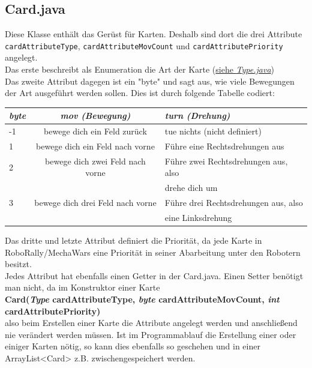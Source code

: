 \documentclass[12pt,a4paper,oneside]{book}
\theoremstyle{plain}
\numberwithin{equation}{chapter} \DeclareMathOperator{\Var}{Var}
\begin{document}
\subsection{Card.java}
    Diese Klasse enthält das Gerüst für Karten. Deshalb sind dort die drei Attribute \texttt{cardAttributeType}, \texttt{cardAttributeMovCount} und \texttt{cardAttributePriority} angelegt. \\
    Das erste beschreibt als Enumeration die Art der Karte (\hyperlink{Type.java}{siehe \textit{Type.java}}) \\
    Das zweite Attribut dagegen ist ein "byte" und sagt aus, wie viele Bewegungen der Art ausgeführt werden sollen. Dies ist durch folgende Tabelle codiert: \\
    \begin{center} \begin{longtable}{|l|c|l|}
    \hline
    \textit{byte}   & \textit{mov (Bewegung)}           & \textit{turn (Drehung)} \\ \hline
    -1              & bewege dich ein Feld zurück       & tue nichts (nicht definiert)\\ \hline
    1               & bewege dich ein Feld nach vorne   & Führe eine Rechtsdrehungen aus\\\hline
    2               & bewege dich zwei Feld nach vorne  & Führe zwei Rechtsdrehungen aus, also\\
                    &                                   & drehe dich um\\\hline
    3               & bewege dich drei Feld nach vorne  & Führe drei Rechtsdrehungen aus, also\\
                    &                                   & eine Linksdrehung\\\hline
    \end{longtable} \end{center}
    Das dritte und letzte Attribut definiert die Priorität, da jede Karte in RoboRally/MechaWars eine Priorität in seiner Abarbeitung unter den Robotern besitzt. \\
    Jedes Attribut hat ebenfalls einen Getter in der Card.java. Einen Setter benötigt man nicht, da im Konstruktor einer Karte \\
    \textbf{Card(\textit{Type} cardAttributeType, \textit{byte} cardAttributeMovCount, \textit{int} cardAttributePriority)}\\
    also beim Erstellen einer Karte die Attribute angelegt werden und anschließend nie verändert werden müssen. Ist im Programmablauf die Erstellung einer oder einiger Karten nötig, so kann dies ebenfalls so geschehen und in einer ArrayList<Card> z.B. zwischengespeichert werden.\\
\end{document}
